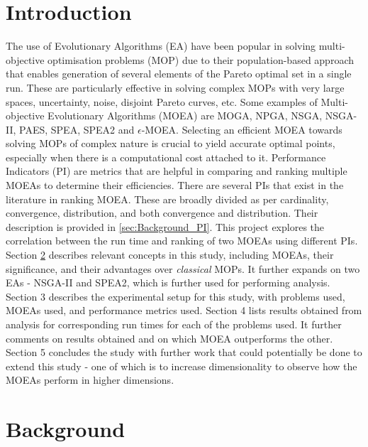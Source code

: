 \documentclass[sigconf, nonacm, preprint]{acmart}
\begin{document}
\section{Introduction}
The use of Evolutionary Algorithms (EA) have been popular in solving multi-objective optimisation problems (MOP) due to their population-based approach that enables generation of several elements of the Pareto optimal set in a single run. These are particularly effective in solving complex MOPs with very large spaces, uncertainty, noise, disjoint Pareto curves, etc. Some examples of Multi-objective Evolutionary Algorithms (MOEA) are MOGA, NPGA, NSGA, NSGA-II, PAES, SPEA, SPEA2 and $\epsilon$-MOEA\cite{moea2007, deb2002}. Selecting an efficient MOEA towards solving MOPs of complex nature is crucial to yield accurate optimal points, especially when there is a computational cost attached to it. Performance Indicators (PI) are metrics that are helpful in comparing and ranking multiple MOEAs to determine their efficiencies. There are several PIs that exist in the literature in ranking MOEA. These are broadly divided as per cardinality, convergence, distribution, and both convergence and distribution. Their description is provided in \autoref{sec:Background_PI}. This project explores the correlation between the run time and ranking of two MOEAs using different PIs.\\
Section \ref{sec:Background} describes relevant concepts in this study, including MOEAs, their significance, and their advantages over \textit{classical} MOPs. It further expands on two EAs - NSGA-II and SPEA2, which is further used for performing analysis. Section 3 describes the experimental setup for this study, with problems used, MOEAs used, and performance metrics used. Section 4 lists results obtained from analysis for corresponding run times for each of the problems used. It further comments on results obtained and on which MOEA outperforms the other. Section 5 concludes the study with further work that could potentially be done to extend this study - one of which is to increase dimensionality to observe how the MOEAs perform in higher dimensions.

\section{Background} \label{sec:Background}
\end{document}
